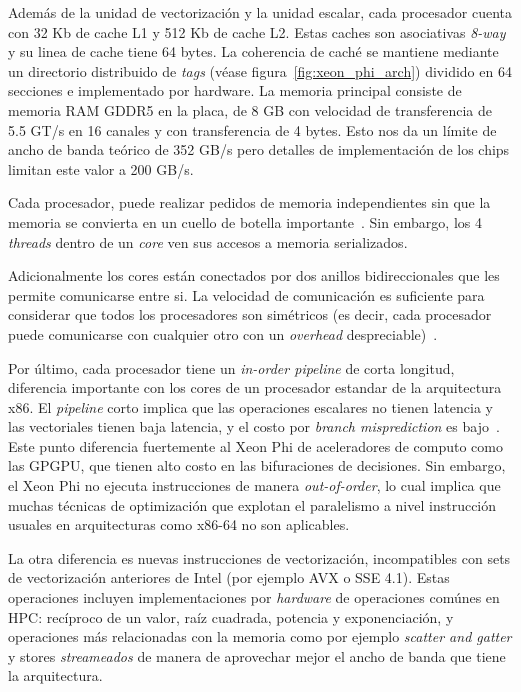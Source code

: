 Adem\'as de la unidad de vectorizaci\'on y la unidad escalar, cada procesador cuenta con 32 Kb de cache L1 y 512 Kb de cache
L2. Estas caches son asociativas \textit{8-way} y su linea de cache tiene 64 bytes. La coherencia de cach\'e se mantiene
mediante un directorio distribuido de \textit{tags} (v\'ease figura~\ref{fig:xeon_phi_arch}) dividido en 64 secciones e implementado
por hardware. La memoria principal consiste de memoria RAM GDDR5 en la placa, de 8 GB con velocidad de transferencia de 5.5 GT/s en 16 canales y con transferencia de 4
bytes. Esto nos da un l\'imite de ancho de banda te\'orico de 352 GB/s pero detalles de implementaci\'on de los chips limitan este valor a 200 GB/s.

Cada procesador, puede realizar pedidos de memoria independientes sin que la memoria se convierta en un cuello
de botella importante~\cite{Fang}. Sin embargo, los 4 \textit{threads} dentro de un \textit{core} ven sus accesos a memoria serializados.

Adicionalmente los cores est\'an conectados por dos anillos bidireccionales que les permite comunicarse entre si. La velocidad de
comunicaci\'on es suficiente para considerar que todos los procesadores son sim\'etricos (es decir, cada procesador puede comunicarse con
cualquier otro con un \textit{overhead} despreciable)~\cite{Fang}.

Por \'ultimo, cada procesador tiene un \textit{in-order pipeline} de corta longitud, diferencia importante con los cores de un procesador
estandar de la arquitectura x86. El \textit{pipeline} corto implica que las operaciones escalares no tienen latencia y las vectoriales tienen baja latencia,
y el costo por \textit{branch misprediction} es bajo~\cite{IntelXeonWhitePaper}. Este punto diferencia fuertemente al Xeon Phi de aceleradores de computo como las GPGPU,
que tienen alto costo en las bifuraciones de decisiones. Sin embargo, el Xeon Phi no ejecuta instrucciones de manera \textit{out-of-order}, lo cual implica que muchas
t\'ecnicas de optimizaci\'on que explotan el paralelismo a nivel instrucci\'on usuales en arquitecturas como x86-64 no son aplicables.

La otra diferencia es nuevas instrucciones de vectorizaci\'on, incompatibles con sets de vectorizaci\'on anteriores de Intel (por ejemplo AVX o SSE 4.1).
Estas operaciones incluyen implementaciones por \textit{hardware} de operaciones com\'unes en HPC: rec\'iproco de un valor, ra\'iz cuadrada, potencia y
exponenciaci\'on, y operaciones m\'as relacionadas con la memoria como por ejemplo \textit{scatter and gatter} y stores \textit{streameados} de manera de aprovechar
mejor el ancho de banda que tiene la arquitectura.

